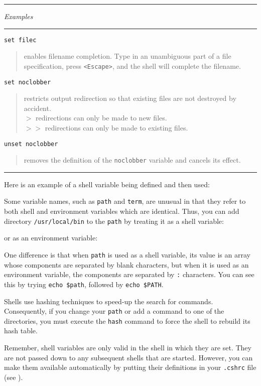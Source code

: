 \documentclass[twoside,11pt,nolof]{starlink}
\providecommand{\example}[2]{\goodbreak
                         \texttt{#1}
                         \vspace*{-4mm}
                         \begin{quote}
                           {\small #2}
                         \end{quote}
                        }
\providecommand{\exbegin}{\begin{center}
                      \rule{18mm}{0.3mm}
                      \emph{Examples}
                      \rule{18mm}{0.3mm}
                      \end{center}
                     }
\providecommand{\exend}{\begin{center}
                    \rule{50mm}{0.3mm}
                    \end{center}
                   }
\begin{document}
\goodbreak

\exbegin

\example{set filec}
{enables filename completion.
Type in an unambiguous part of a file specification, press \texttt{<Escape>}, and
the shell will complete the filename.}

\example{set noclobber}
{restricts output redirection so that existing files are not destroyed by
accident.\\
\texttt{$>$} redirections can only be made to new files.\\
\texttt{$>>$} redirections can only be made to existing files.}

\example{unset noclobber}
{removes the definition of the \texttt{noclobber} variable and cancels its effect.}

\exend

Here is an example of a shell variable being defined and then used:
\begin{terminalv}
\end{terminalv}

Some variable names, such as \texttt{path} and \texttt{term}, are unusual in that
they refer to both shell and environment variables which are identical.
Thus, you can add directory \texttt{/usr/local/bin} to the \texttt{path} by treating
it as a shell variable:
\begin{terminalv}
\end{terminalv}
or as an environment variable:
\begin{terminalv}
\end{terminalv}
One difference is that when \texttt{path} is used as a shell variable, its value is
an array whose components are separated by blank characters, but when it is
used as an environment variable, the components are separated by \texttt{:}
characters.
You can see this by trying \texttt{echo \$path}, followed by \texttt{echo \$PATH}.

Shells use hashing techniques to speed-up the search for commands.
Consequently, if you change your \texttt{path} or add a command to one of
the directories, you must execute the \texttt{hash} command to force the shell
to rebuild its hash table.

Remember, shell variables are only valid in the shell in which they are set.
They are not passed down to any subsequent shells that are started.
However, you can make them available automatically by putting their definitions
in your \texttt{.cshrc} file (see ).
\end{document}
